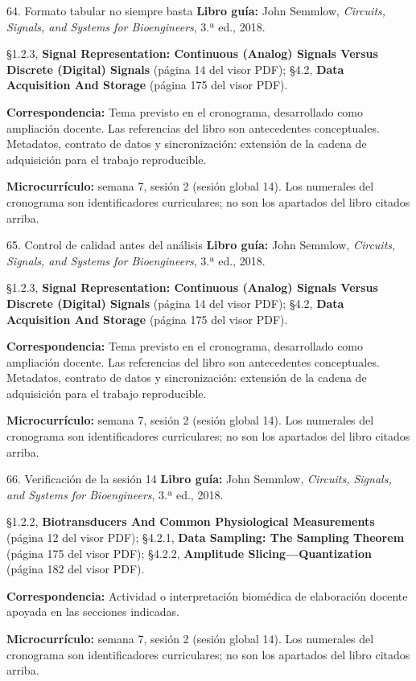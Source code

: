 \documentclass[
  10pt,
  ignorenonframetext,
  aspectratio=169,
  spanish,
]{beamer}
\begin{document}
\begin{frame}{64. Formato tabular no siempre basta}
\label{formato-tabular-no-siempre-basta}
\textbf{Libro guía:} John Semmlow, \emph{Circuits, Signals, and Systems
for Bioengineers}, 3.ª ed., 2018.

§1.2.3, \textbf{Signal Representation: Continuous (Analog) Signals
Versus Discrete (Digital) Signals} (página 14 del visor PDF); §4.2,
\textbf{Data Acquisition And Storage} (página 175 del visor PDF).

\textbf{Correspondencia:} Tema previsto en el cronograma, desarrollado
como ampliación docente. Las referencias del libro son antecedentes
conceptuales. Metadatos, contrato de datos y sincronización: extensión
de la cadena de adquisición para el trabajo reproducible.

\textbf{Microcurrículo:} semana 7, sesión 2 (sesión global 14). Los
numerales del cronograma son identificadores curriculares; no son los
apartados del libro citados arriba.
\end{frame}

\begin{frame}{65. Control de calidad antes del análisis}
\label{control-de-calidad-antes-del-anuxe1lisis}
\textbf{Libro guía:} John Semmlow, \emph{Circuits, Signals, and Systems
for Bioengineers}, 3.ª ed., 2018.

§1.2.3, \textbf{Signal Representation: Continuous (Analog) Signals
Versus Discrete (Digital) Signals} (página 14 del visor PDF); §4.2,
\textbf{Data Acquisition And Storage} (página 175 del visor PDF).

\textbf{Correspondencia:} Tema previsto en el cronograma, desarrollado
como ampliación docente. Las referencias del libro son antecedentes
conceptuales. Metadatos, contrato de datos y sincronización: extensión
de la cadena de adquisición para el trabajo reproducible.

\textbf{Microcurrículo:} semana 7, sesión 2 (sesión global 14). Los
numerales del cronograma son identificadores curriculares; no son los
apartados del libro citados arriba.
\end{frame}

\begin{frame}{66. Verificación de la sesión 14}
\label{verificaciuxf3n-de-la-sesiuxf3n-14}
\textbf{Libro guía:} John Semmlow, \emph{Circuits, Signals, and Systems
for Bioengineers}, 3.ª ed., 2018.

§1.2.2, \textbf{Biotransducers And Common Physiological Measurements}
(página 12 del visor PDF); §4.2.1, \textbf{Data Sampling: The Sampling
Theorem} (página 175 del visor PDF); §4.2.2, \textbf{Amplitude
Slicing---Quantization} (página 182 del visor PDF).

\textbf{Correspondencia:} Actividad o interpretación biomédica de
elaboración docente apoyada en las secciones indicadas.

\textbf{Microcurrículo:} semana 7, sesión 2 (sesión global 14). Los
numerales del cronograma son identificadores curriculares; no son los
apartados del libro citados arriba.
\end{frame}
\end{document}
